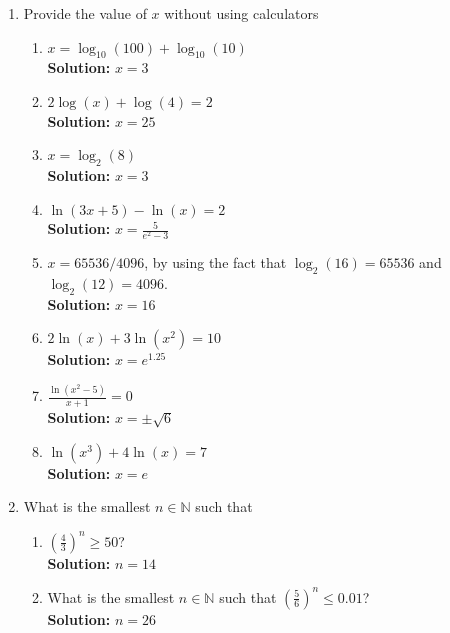 \documentclass{article}
\begin{document}
\begin{enumerate}[leftmargin = 0.5cm, label = \arabic*., rightmargin = 0.2cm]

    \item Provide the value of $x$ without using calculators

    \begin{enumerate}[leftmargin = 0.5cm, label = (\alph*), rightmargin = 0.2cm]
    
        \item $x = \log_{10}(100) + \log_{10}(10)$ \\ \textbf{Solution:} \( x = 3 \)
        \item $2 \log(x) + \log(4) = 2$ \\ \textbf{Solution:} \( x = 25 \)
        \item $x = \log_2(8)$ \\ \textbf{Solution:} \( x = 3 \)
        \item $\ln(3x + 5) - \ln(x) = 2$ \\ \textbf{Solution:} \( x = \frac{5}{e^2 - 3} \)
        \item $x = 65536 / 4096$, by using the fact that $\log_2(16) = 65536$ and $\log_2(12) = 4096$. \\ \textbf{Solution:} \( x = 16 \)
        \item $2 \ln(x) + 3 \ln(x^2) = 10$ \\ \textbf{Solution:} \( x = e^{1.25} \)
        \item $\frac{\ln(x^2 - 5)}{x + 1} = 0$ \\ \textbf{Solution:} \( x = \pm\sqrt{6} \)
        \item $\ln(x^3) + 4 \ln(x) = 7$ \\ \textbf{Solution:} \( x = e \)
    
    \end{enumerate}

    \item What is the smallest $n \in \mathbb{N}$ such that 

    \begin{enumerate}[leftmargin = 0.5cm, label = (\alph*), rightmargin = 0.2cm]
    
        \item  $\left( \frac{4}{3} \right)^n \geq 50$? \\ \textbf{Solution:} \( n = 14 \)
        \item What is the smallest $n \in \mathbb{N}$ such that $\left( \frac{5}{6} \right)^n \leq 0.01$? \\ \textbf{Solution:} \( n = 26 \)
    
    \end{enumerate}

\end{enumerate}
\end{document}
